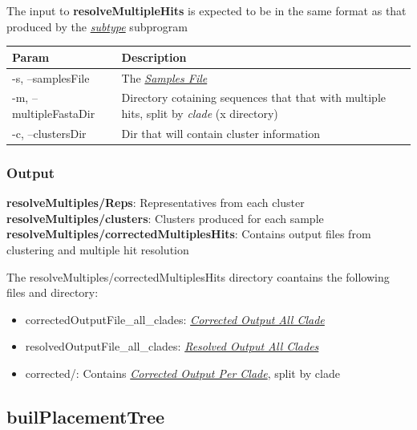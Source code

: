 \documentclass[letterpaper,10pt,english]{sphinxmanual}
\begin{document}
The input to \textbf{resolveMultipleHits} is expected to be in the same format as that produced by the {\hyperref[CommanLine:subtype]{\emph{subtype}}} subprogram

\begin{tabulary}{\linewidth}{|L|L|}
\hline
\textsf{\relax 
Param
} & \textsf{\relax 
Description
}\\
\hline
-s, --samplesFile
 & 
The {\hyperref[defs:samplefile]{\emph{Samples File}}}
\\

-m, --multipleFastaDir
 & 
Directory cotaining sequences that that with multiple hits, split by \emph{clade} (x directory)
\\

-c, --clustersDir
 & 
Dir that will contain cluster information
\\
\hline\end{tabulary}



\subsubsection{Output}
\label{CommanLine:id6}
\textbf{resolveMultiples/Reps}: Representatives from each cluster
\textbf{resolveMultiples/clusters}: Clusters produced for each sample
\textbf{resolveMultiples/correctedMultiplesHits}: Contains output files from clustering and multiple hit resolution

The resolveMultiples/correctedMultiplesHits directory coantains the following files and directory:
\begin{itemize}
\item {} 
correctedOutputFile\_all\_clades: {\hyperref[defs:correctedall]{\emph{Corrected Output All Clade}}}

\item {} 
resolvedOutputFile\_all\_clades: {\hyperref[defs:resolvedall]{\emph{Resolved Output All Clades}}}

\item {} 
corrected/: Contains {\hyperref[defs:correctedperclade]{\emph{Corrected Output Per Clade}}}, split by clade

\end{itemize}


\subsection{builPlacementTree}
\label{CommanLine:id7}\label{CommanLine:builplacementtree}
\end{document}
